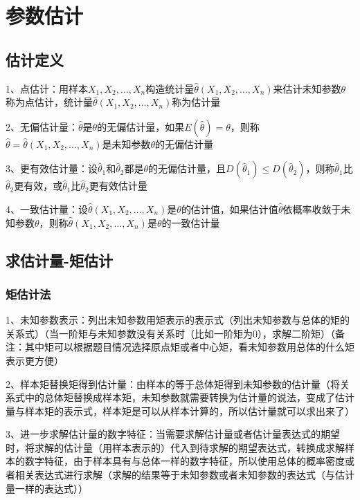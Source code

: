 \chapter{参数估计}

\section{估计定义}

1、点估计：用样本$X_1,X_2,\ldots,X_n$构造统计量$\hat \theta(X_1,X_2,\ldots,X_n)$来估计未知参数$\theta$称为点估计，统计量$\hat \theta(X_1,X_2,\ldots,X_n)$称为估计量

2、无偏估计量：$\hat \theta$是$\theta$的无偏估计量，如果$E(\hat \theta)=\theta$，则称$\hat \theta=\hat \theta(X_1,X_2,\ldots,X_n)$是未知参数$\theta$的无偏估计量

3、更有效估计量：设$\hat \theta_1$和$\hat \theta_2$都是$\theta$的无偏估计量，且$D(\hat \theta_1) \le D(\hat \theta_2)$，则称$\hat \theta_1$比$\hat \theta_2$更有效，或$\hat \theta_1$比$\hat \theta_2$更有效估计量

4、一致估计量：设$\hat \theta(X_1,X_2,\ldots,X_n)$是$\theta$的估计值，如果估计值$\hat \theta$依概率收敛于未知参数$\theta$，则称$\hat \theta(X_1,X_2,\ldots,X_n)$是$\theta$的一致估计量

\section{求估计量-矩估计}



\subsection{矩估计法}

1、未知参数表示：列出未知参数用矩表示的表示式（列出未知参数与总体的矩的关系式）（当一阶矩与未知参数没有关系时（比如一阶矩为0），求解二阶矩）（备注：其中矩可以根据题目情况选择原点矩或者中心矩，看未知参数用总体的什么矩表示更方便）

2、样本矩替换矩得到估计量：由样本的等于总体矩得到未知参数的估计量（将关系式中的总体矩替换成样本矩，未知参数就需要转换为估计量的说法，变成了估计量与样本矩的表示式，样本矩是可以从样本计算的，所以估计量就可以求出来了）

3、进一步求解估计量的数字特征：当需要求解估计量或者估计量表达式的期望时，将求解的估计量（用样本表示的）代入到待求解的期望表达式，转换成求解样本的数字特征，由于样本具有与总体一样的数字特征，所以使用总体的概率密度或者相关表达式进行求解（求解的结果等于未知参数或者未知参数的表达式（与估计量一样的表达式））


